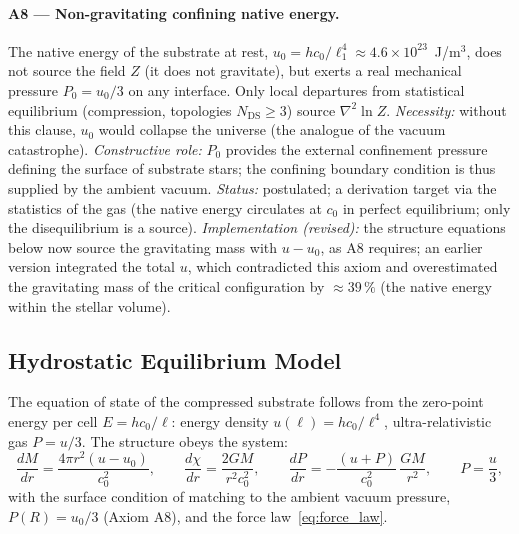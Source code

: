 \documentclass[11pt,a4paper]{article}
\theoremstyle{plain}
\theoremstyle{remark}
\newcommand{\Ncd}{\ensuremath{N_{\mathrm{DS}}}}
\begin{document}
\paragraph{A8 --- Non-gravitating confining native energy.}
The native energy of the substrate at rest, $u_0 = h c_0/\ell_1^4 \approx 4.6\times10^{23}$~J/m$^3$, does not source the field $Z$ (it does not gravitate), but exerts a real mechanical pressure $P_0 = u_0/3$ on any interface. Only local departures from statistical equilibrium (compression, topologies $\Ncd\geq3$) source $\nabla^2 \ln Z$. \emph{Necessity:} without this clause, $u_0$ would collapse the universe (the analogue of the vacuum catastrophe). \emph{Constructive role:} $P_0$ provides the external confinement pressure defining the surface of substrate stars; the confining boundary condition is thus supplied by the ambient vacuum. \emph{Status:} postulated; a derivation target via the statistics of the gas (the native energy circulates at $c_0$ in perfect equilibrium; only the disequilibrium is a source). \emph{Implementation (revised):} the structure equations below now source the gravitating mass with $u - u_0$, as A8 requires; an earlier version integrated the total $u$, which contradicted this axiom and overestimated the gravitating mass of the critical configuration by $\approx 39\,\%$ (the native energy within the stellar volume).

\subsection{Hydrostatic Equilibrium Model}
The equation of state of the compressed substrate follows from the zero-point energy per cell $E = hc_0/\ell$: energy density $u(\ell) = hc_0/\ell^4$, ultra-relativistic gas $P = u/3$. The structure obeys the system:
\begin{equation}\label{eq:star_structure}
\frac{dM}{dr} = \frac{4\pi r^2 (u - u_0)}{c_0^2}, \qquad
\frac{d\chi}{dr} = \frac{2GM}{r^2 c_0^2}, \qquad
\frac{dP}{dr} = -\frac{(u+P)}{c_0^2}\,\frac{GM}{r^2}, \qquad P = \frac{u}{3},
\end{equation}
with the surface condition of matching to the ambient vacuum pressure, $P(R) = u_0/3$ (Axiom A8), and the force law~\eqref{eq:force_law}.
\end{document}
